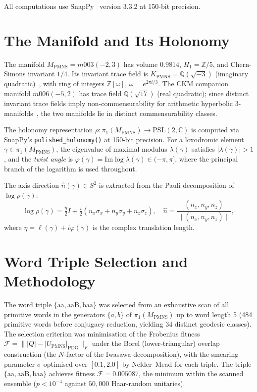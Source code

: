 \documentclass[11pt,a4paper]{article}
\theoremstyle{definition}
\theoremstyle{remark}
\newcommand{\MPMNS}{M_{\mathrm{PMNS}}}
\newcommand{\KPMNS}{K_{\mathrm{PMNS}}}
\newcommand{\PSL}{\mathrm{PSL}(2,\mathbb{C})}
\newcommand{\ZZ}{\mathbb{Z}}
\newcommand{\QQ}{\mathbb{Q}}
\newcommand{\Zfive}{\mathbb{Z}/5}
\begin{document}
All computations use SnapPy~\cite{SnapPy} version 3.3.2
at 150-bit precision.

\section{The Manifold and Its Holonomy}
\label{sec:manifold}

The manifold $\MPMNS=m003(-2,3)$ has volume $0.9814$,
$H_1=\Zfive$, and Chern-Simons invariant $1/4$.
Its invariant trace field is $\KPMNS=\QQ(\sqrt{-3})$
(imaginary quadratic)~\cite{Chinburg98}, with ring of integers
$\ZZ[\omega]$, $\omega=e^{2\pi i/3}$.
The CKM companion manifold $m006(-5,2)$ has trace field
$\QQ(\sqrt{17})$ (real quadratic); since distinct invariant
trace fields imply non-commensurability for arithmetic
hyperbolic 3-manifolds~\cite{MaclachlanReid}, the two
manifolds lie in distinct commensurability classes.

The holonomy representation $\rho:\pi_1(\MPMNS)\to\PSL$ is
computed via SnapPy's \texttt{polished\_holonomy()} at 150-bit
precision.
For a loxodromic element $\gamma\in\pi_1(\MPMNS)$, the eigenvalue
of maximal modulus $\lambda(\gamma)$ satisfies $|\lambda(\gamma)|>1$,
and the \emph{twist angle} is
$\varphi(\gamma)=\mathrm{Im}\log\lambda(\gamma)\in(-\pi,\pi]$,
where the principal branch of the logarithm is used throughout.

The axis direction $\hat{n}(\gamma)\in S^2$ is extracted from
the Pauli decomposition of $\log\rho(\gamma)$:
\[
  \log\rho(\gamma)
  = \tfrac{\eta}{2}I
  + \tfrac{i}{2}(n_x\sigma_x+n_y\sigma_y+n_z\sigma_z),
  \quad
  \hat{n}=\frac{(n_x,n_y,n_z)}{\|(n_x,n_y,n_z)\|},
\]
where $\eta=\ell(\gamma)+i\varphi(\gamma)$ is the complex
translation length.

\section{Word Triple Selection and Methodology}
\label{sec:method}

The word triple $\{\mathrm{aa},\mathrm{aaB},\mathrm{baa}\}$
was selected from an exhaustive scan of all primitive words in the
generators $\{a,b\}$ of $\pi_1(\MPMNS)$ up to word length 5
(484 primitive words before conjugacy reduction, yielding 34
distinct geodesic classes).
The selection criterion was minimisation of the Frobenius fitness
$\mathcal{F} = \||Q|-|U_{\mathrm{PMNS}}|_{\mathrm{PDG}}\|_F$
under the Borel (lower-triangular) overlap construction
(the $N$-factor of the Iwasawa decomposition), with the smearing
parameter $\sigma$ optimised over $[0.1,2.0]$ by Nelder--Mead
for each triple.
The triple $\{\mathrm{aa},\mathrm{aaB},\mathrm{baa}\}$ achieves
fitness $\mathcal{F}=0.005087$, the minimum within the scanned
ensemble ($p<10^{-4}$ against $50{,}000$ Haar-random unitaries).
\end{document}
